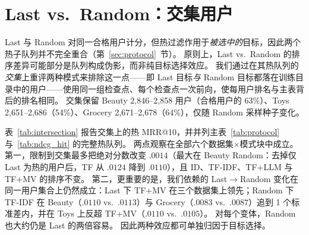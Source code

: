 \documentclass[sigconf,natbib=true,anonymous]{acmart}
\newcommand{\tfidf}{\textsc{TF-IDF}\xspace}
\newcommand{\tfllm}{\textsc{TF+LLM}\xspace}
\newcommand{\tfmv}{\textsc{TF+MV}\xspace}
\begin{document}
\section{Last vs.\ Random：交集用户}
\label{app:intersection}

Last 与 Random 对同一合格用户计分，但热过滤作用于\emph{被选中的}目标，因此两个热子队列并不完全重合（第~\ref{sec:protocol}~节）。
原则上，Last vs.\ Random 的排序差异可能部分是队列构成伪影，而非纯目标选择效应。
我们通过在其热队列的\emph{交集}上重评两种模式来排除这一点——即 Last 目标\emph{与} Random 目标都落在训练目录中的用户——使用同一组检查点、每个检查点一次前向，使每用户排名与主表背后的排名相同。
交集保留 Beauty 2{,}846--2{,}858 用户（合格用户的 63\%）、Toys 2{,}651--2{,}686（54\%）、Grocery 2{,}671--2{,}678（64\%），仅随 Random 采样种子变化。

表~\ref{tab:intersection} 报告交集上的热 MRR@10，并并列主表~\ref{tab:protocol} 与~\ref{tab:ndcg_hit} 的完整热队列。
两点观察在全部六个数据集$\times$模式块中成立。
第一，限制到交集最多把绝对分数改变 $.0014$（最大在 Beauty Random：去掉仅 Last 为热的用户后，TF 从 $.0124$ 降到 $.0110$），且 ID、\tfidf、\tfllm 与 \tfmv 的排序不变。
第二，更重要的是，我们依赖的 Last$\to$Random 变化在同一用户集合上仍然成立：Last 下 \tfmv 在三个数据集上领先；Random 下 \tfidf 在 Beauty（$.0110$ vs.\ $.0113$）与 Grocery（$.0083$ vs.\ $.0087$）追到 1 个标准差内，并在 Toys 上反超 \tfmv（$.0110$ vs.\ $.0105$）。
对每个变体，Random 也大约仍是 Last 的两倍容易。
因此两种效应都可单独归因于目标选择。
\end{document}
